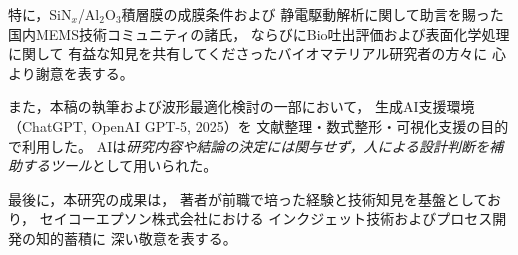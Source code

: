\documentclass[conference]{IEEEtran}
\begin{document}
特に，SiN$_x$/Al$_2$O$_3$積層膜の成膜条件および
静電駆動解析に関して助言を賜った
国内MEMS技術コミュニティの諸氏，
ならびにBio吐出評価および表面化学処理に関して
有益な知見を共有してくださったバイオマテリアル研究者の方々に
心より謝意を表する。

また，本稿の執筆および波形最適化検討の一部において，
生成AI支援環境（ChatGPT, OpenAI GPT-5, 2025）を
文献整理・数式整形・可視化支援の目的で利用した。
AIは\emph{研究内容や結論の決定には関与せず，人による設計判断を補助するツール}として用いられた。

\vspace{2pt}
\noindent
最後に，本研究の成果は，
著者が前職で培った経験と技術知見を基盤としており，
セイコーエプソン株式会社における
インクジェット技術およびプロセス開発の知的蓄積に
深い敬意を表する。


\end{document}
